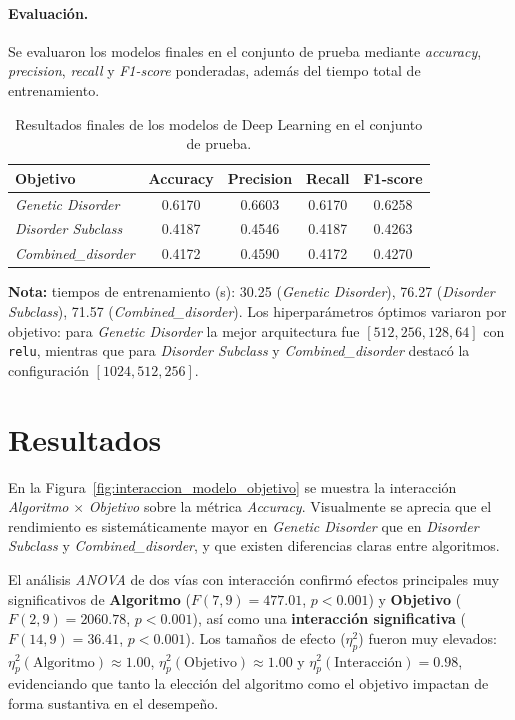 \documentclass[11pt,a4paper,spanish]{book}
\numberwithin{equation}{chapter}
\numberwithin{figure}{chapter}
\begin{document}
\paragraph{Evaluación.}
Se evaluaron los modelos finales en el conjunto de prueba mediante 
\textit{accuracy}, \textit{precision}, \textit{recall} y \textit{F1-score} ponderadas,
además del tiempo total de entrenamiento.

\begin{table}[H]
\centering
\caption{Resultados finales de los modelos de Deep Learning en el conjunto de prueba.}
\label{tab:dl-resultados}
\begin{tabular}{lcccc}
\toprule
\textbf{Objetivo} & \textbf{Accuracy} & \textbf{Precision} & \textbf{Recall} & \textbf{F1-score} \\
\midrule
\textit{Genetic Disorder}   & 0.6170 & 0.6603 & 0.6170 & 0.6258 \\
\textit{Disorder Subclass}  & 0.4187 & 0.4546 & 0.4187 & 0.4263 \\
\textit{Combined\_disorder} & 0.4172 & 0.4590 & 0.4172 & 0.4270 \\
\bottomrule
\end{tabular}

\vspace{0.5em}
\footnotesize
\textbf{Nota:} tiempos de entrenamiento (s): 30.25 (\textit{Genetic Disorder}), 
76.27 (\textit{Disorder Subclass}), 71.57 (\textit{Combined\_disorder}). 
Los hiperparámetros óptimos variaron por objetivo: 
para \textit{Genetic Disorder} la mejor arquitectura fue $[512,256,128,64]$ con \texttt{relu}, 
mientras que para \textit{Disorder Subclass} y \textit{Combined\_disorder} destacó la 
configuración $[1024,512,256]$.
\end{table}

\section{Resultados}

En la Figura~\ref{fig:interaccion_modelo_objetivo} se muestra la interacción \textit{Algoritmo} $\times$ \textit{Objetivo} sobre la métrica \textit{Accuracy}. Visualmente se aprecia que el rendimiento es sistemáticamente mayor en \textit{Genetic Disorder} que en \textit{Disorder Subclass} y \textit{Combined\_disorder}, y que existen diferencias claras entre algoritmos.

El análisis \textit{ANOVA} de dos vías con interacción confirmó efectos principales muy significativos de \textbf{Algoritmo} ($F(7,9)=477.01$, $p<0.001$) y \textbf{Objetivo} ($F(2,9)=2060.78$, $p<0.001$), así como una \textbf{interacción significativa} ($F(14,9)=36.41$, $p<0.001$). Los tamaños de efecto ($\eta^2_p$) fueron muy elevados: $\eta^2_p(\text{Algoritmo})\approx1.00$, $\eta^2_p(\text{Objetivo})\approx1.00$ y $\eta^2_p(\text{Interacción})=0.98$, evidenciando que tanto la elección del algoritmo como el objetivo impactan de forma sustantiva en el desempeño.
\end{document}

